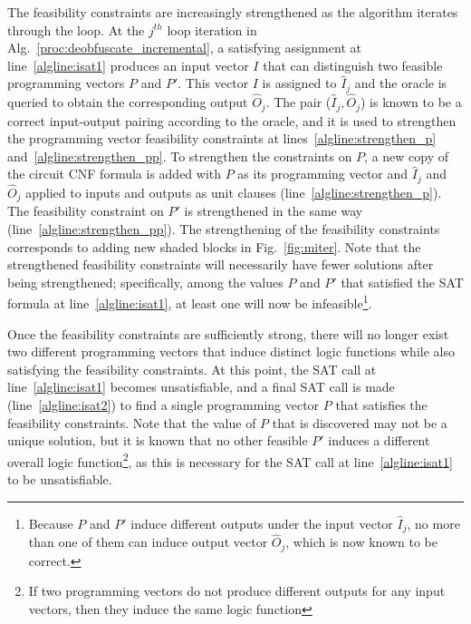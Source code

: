\documentclass[thesis]{umassthesis}  %
\begin{document}
The feasibility constraints are increasingly strengthened as the algorithm iterates through the loop. At the $j^{th}$ loop iteration in Alg.~\ref{proc:deobfuscate_incremental}, a satisfying assignment at line~\ref{algline:isat1} produces an input vector $I$ that can distinguish two feasible programming vectors $P$ and $P'$. This vector $I$ is assigned to $\widehat{I}_j$ and the oracle is queried to obtain the corresponding output $\widehat{O}_j$. {The pair ($\widehat{I}_j, \widehat{O}_j$) is known to be a correct input-output pairing according to the oracle, and it is used to strengthen the programming vector feasibility constraints at lines~\ref{algline:strengthen_p} and~\ref{algline:strengthen_pp}}. To strengthen the constraints on $P$, a new copy of the circuit CNF formula is added with $P$ as its programming vector and $\widehat{I}_j$ and $\widehat{O}_j$ applied to inputs and outputs as unit clauses (line~\ref{algline:strengthen_p}). The feasibility constraint on $P'$ is strengthened in the same way (line~\ref{algline:strengthen_pp}). {The strengthening of the feasibility constraints corresponds to adding new shaded blocks in Fig.~\ref{fig:miter}. Note that the strengthened feasibility constraints will necessarily have fewer solutions after being strengthened; specifically, among the values $P$ and $P'$ that satisfied the SAT formula at line~\ref{algline:isat1}, at least one will now be infeasible\footnote{Because $P$ and $P'$ induce different outputs under the input vector $\widehat{I}_j$, no more than one of them can induce output vector $\widehat{O}_j$, which is now known to be correct.}.}

Once the feasibility constraints are sufficiently strong, there will no longer exist two different programming vectors that induce distinct logic functions while also satisfying the feasibility constraints. At this point, the SAT call at line~\ref{algline:isat1} becomes unsatisfiable, and a final SAT call is made (line~\ref{algline:isat2}) to find a single programming vector $P$ that satisfies the feasibility constraints. Note that the value of $P$ that is discovered may not be a unique solution, but it is known that no other feasible $P'$ induces a different overall logic function\footnote{If two programming vectors do not produce different outputs for any input vectors, then they induce the same logic function}, as this is necessary for the SAT call at line~\ref{algline:isat1} to be unsatisfiable.
\end{document}
